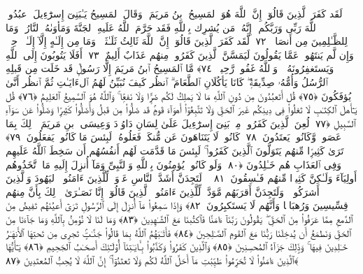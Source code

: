  لَقَد كَفَرَ ٱلَّذِينَ قَالُوٓا۟ إِنَّ ٱللَّهَ هُوَ ٱلمَسِيحُ ٱبنُ مَريَمَ ۖ وَقَالَ ٱلمَسِيحُ يَـٰبَنِىٓ إِسرَٰٓءِيلَ ٱعبُدُوا۟ ٱللَّهَ رَبِّى وَرَبَّكُم ۖ إِنَّهُۥ مَن يُشرِك بِٱللَّهِ فَقَد حَرَّمَ ٱللَّهُ عَلَيهِ ٱلجَنَّةَ وَمَأوَىٰهُ ٱلنَّارُ ۖ وَمَا لِلظَّـٰلِمِينَ مِن أَنصَارٍۢ ﴿٧٢﴾
 لَّقَد كَفَرَ ٱلَّذِينَ قَالُوٓا۟ إِنَّ ٱللَّهَ ثَالِثُ ثَلَـٰثَةٍۢ ۘ وَمَا مِن إِلَـٰهٍ إِلَّآ إِلَـٰهٌۭ وَٟحِدٌۭ ۚ وَإِن لَّم يَنتَهُوا۟ عَمَّا يَقُولُونَ لَيَمَسَّنَّ ٱلَّذِينَ كَفَرُوا۟ مِنهُم عَذَابٌ أَلِيمٌ ﴿٧٣﴾
 أَفَلَا يَتُوبُونَ إِلَى ٱللَّهِ وَيَستَغفِرُونَهُۥ ۚ وَٱللَّهُ غَفُورٌۭ رَّحِيمٌۭ ﴿٧٤﴾
 مَّا ٱلمَسِيحُ ٱبنُ مَريَمَ إِلَّا رَسُولٌۭ قَد خَلَت مِن قَبلِهِ ٱلرُّسُلُ وَأُمُّهُۥ صِدِّيقَةٌۭ ۖ كَانَا يَأكُلَانِ ٱلطَّعَامَ ۗ ٱنظُر كَيفَ نُبَيِّنُ لَهُمُ ٱلءَايَـٰتِ ثُمَّ ٱنظُر أَنَّىٰ يُؤفَكُونَ ﴿٧٥﴾
 قُل أَتَعبُدُونَ مِن دُونِ ٱللَّهِ مَا لَا يَملِكُ لَكُم ضَرًّۭا وَلَا نَفعًۭا ۚ وَٱللَّهُ هُوَ ٱلسَّمِيعُ ٱلعَلِيمُ ﴿٧٦﴾
 قُل يَـٰٓأَهلَ ٱلكِتَـٰبِ لَا تَغلُوا۟ فِى دِينِكُم غَيرَ ٱلحَقِّ وَلَا تَتَّبِعُوٓا۟ أَهوَآءَ قَومٍۢ قَد ضَلُّوا۟ مِن قَبلُ وَأَضَلُّوا۟ كَثِيرًۭا وَضَلُّوا۟ عَن سَوَآءِ ٱلسَّبِيلِ ﴿٧٧﴾
 لُعِنَ ٱلَّذِينَ كَفَرُوا۟ مِنۢ بَنِىٓ إِسرَٰٓءِيلَ عَلَىٰ لِسَانِ دَاوُۥدَ وَعِيسَى ٱبنِ مَريَمَ ۚ ذَٟلِكَ بِمَا عَصَوا۟ وَّكَانُوا۟ يَعتَدُونَ ﴿٧٨﴾
 كَانُوا۟ لَا يَتَنَاهَونَ عَن مُّنكَرٍۢ فَعَلُوهُ ۚ لَبِئسَ مَا كَانُوا۟ يَفعَلُونَ ﴿٧٩﴾
 تَرَىٰ كَثِيرًۭا مِّنهُم يَتَوَلَّونَ ٱلَّذِينَ كَفَرُوا۟ ۚ لَبِئسَ مَا قَدَّمَت لَهُم أَنفُسُهُم أَن سَخِطَ ٱللَّهُ عَلَيهِم وَفِى ٱلعَذَابِ هُم خَـٰلِدُونَ ﴿٨٠﴾
 وَلَو كَانُوا۟ يُؤمِنُونَ بِٱللَّهِ وَٱلنَّبِىِّ وَمَآ أُنزِلَ إِلَيهِ مَا ٱتَّخَذُوهُم أَولِيَآءَ وَلَـٰكِنَّ كَثِيرًۭا مِّنهُم فَـٰسِقُونَ ﴿٨١﴾
 ۞ لَتَجِدَنَّ أَشَدَّ ٱلنَّاسِ عَدَٟوَةًۭ لِّلَّذِينَ ءَامَنُوا۟ ٱليَهُودَ وَٱلَّذِينَ أَشرَكُوا۟ ۖ وَلَتَجِدَنَّ أَقرَبَهُم مَّوَدَّةًۭ لِّلَّذِينَ ءَامَنُوا۟ ٱلَّذِينَ قَالُوٓا۟ إِنَّا نَصَـٰرَىٰ ۚ ذَٟلِكَ بِأَنَّ مِنهُم قِسِّيسِينَ وَرُهبَانًۭا وَأَنَّهُم لَا يَستَكبِرُونَ ﴿٨٢﴾
 وَإِذَا سَمِعُوا۟ مَآ أُنزِلَ إِلَى ٱلرَّسُولِ تَرَىٰٓ أَعيُنَهُم تَفِيضُ مِنَ ٱلدَّمعِ مِمَّا عَرَفُوا۟ مِنَ ٱلحَقِّ ۖ يَقُولُونَ رَبَّنَآ ءَامَنَّا فَٱكتُبنَا مَعَ ٱلشَّـٰهِدِينَ ﴿٨٣﴾
 وَمَا لَنَا لَا نُؤمِنُ بِٱللَّهِ وَمَا جَآءَنَا مِنَ ٱلحَقِّ وَنَطمَعُ أَن يُدخِلَنَا رَبُّنَا مَعَ ٱلقَومِ ٱلصَّـٰلِحِينَ ﴿٨٤﴾
 فَأَثَـٰبَهُمُ ٱللَّهُ بِمَا قَالُوا۟ جَنَّـٰتٍۢ تَجرِى مِن تَحتِهَا ٱلأَنهَـٰرُ خَـٰلِدِينَ فِيهَا ۚ وَذَٟلِكَ جَزَآءُ ٱلمُحسِنِينَ ﴿٨٥﴾
 وَٱلَّذِينَ كَفَرُوا۟ وَكَذَّبُوا۟ بِـَٔايَـٰتِنَآ أُو۟لَـٰٓئِكَ أَصحَـٰبُ ٱلجَحِيمِ ﴿٨٦﴾
 يَـٰٓأَيُّهَا ٱلَّذِينَ ءَامَنُوا۟ لَا تُحَرِّمُوا۟ طَيِّبَٰتِ مَآ أَحَلَّ ٱللَّهُ لَكُم وَلَا تَعتَدُوٓا۟ ۚ إِنَّ ٱللَّهَ لَا يُحِبُّ ٱلمُعتَدِينَ ﴿٨٧﴾
